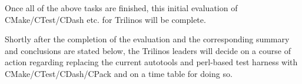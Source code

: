 \documentclass[pdf,ps2pdf,11pt]{SANDreport}
\begin{document}
Once all of the above tasks are finished, this initial evaluation of
CMake/CTest/CDash etc. for Trilinos will be complete.

Shortly after the completion of the evaluation and the corresponding
summary and conclusions are stated below, the Trilinos leaders will
decide on a course of action regarding replacing the current autotools
and perl-based test harness with CMake/CTest/CDash/CPack and on a time
table for doing so.


\begin{SANDdistribution}[NM]
\end{SANDdistribution}
\end{document}
